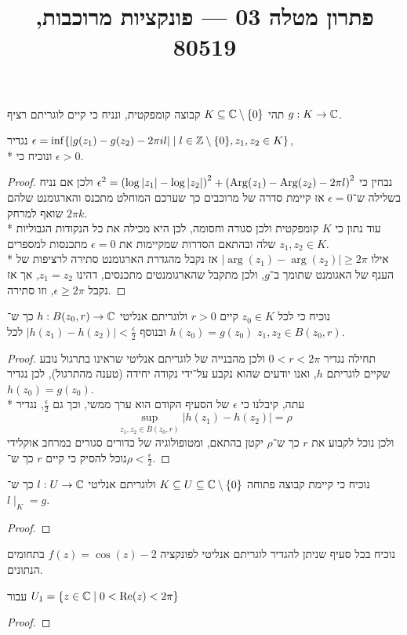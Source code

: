 
\title{פתרון מטלה 03 --- פונקציות מרוכבות, 80519}


\maketitle
\maketitleprint{}

\Question{}
תהי $K \subseteq \mathbb{C} \setminus \{ 0 \}$ קבוצה קומפקטית, ונניח כי קיים לוגריתם רציף $g : K \to \mathbb{C}$.

\Subquestion{}
נגדיר $\epsilon = \inf \{ |g(z_1) - g(z_2) - 2 \pi i l| \mid l \in \mathbb{Z} \setminus \{ 0 \}, z_1, z_2 \in K \}$, \\*
ונוכיח כי $\epsilon > 0$.
\begin{proof}
	נבחין כי $\epsilon^2 = {(\log|z_1| - \log|z_2|)}^2 + {(\operatorname{Arg}(z_1) - \operatorname{Arg}(z_2) - 2 \pi l)}^2$ ולכן אם נניח בשלילה ש־$\epsilon = 0$ אז קיימת סדרה של מרוכבים כך שערכם המוחלט מתכנס והארגומנט שלהם שואף למרחק $2\pi k$. \\*
	עוד נתון כי $K$ קומפקטית ולכן סגורה וחסומה, לכן היא מכילה את כל הנקודות הגבוליות שלה ובהתאם הסדרות שמקיימות את $\epsilon = 0$ מתכנסות למספרים $z_1, z_2 \in K$. \\*
	אילו $|\arg(z_1) - \arg(z_2)| \ge 2\pi$ אז נקבל מהגדרת הארגומנט סתירה לרציפות של הענף של האגומנט שתומך ב־$g$, ולכן מתקבל שהארגומנטים מתכנסים, דהינו $z_1 = z_2$, אך אז נקבל $\epsilon \ge 2\pi$, וזו סתירה.
\end{proof}

\Subquestion{}
נוכיח כי לכל $z_0 \in K$ קיים $r > 0$ ולוגריתם אנליטי $h : B(z_0, r) \to \mathbb{C}$ כך ש־$h(z_0) = g(z_0)$ ובנוסף $|h(z_1) - h(z_2)| < \frac{\epsilon}{2}$ לכל $z_1, z_2 \in B(z_0, r)$.
\begin{proof}
	תחילה נגדיר $0 < r < 2 \pi$ ולכן מהבנייה של לוגריתם אנליטי שראינו בתרגול נובע שקיים לוגריתם $h$, ואנו יודעים שהוא נקבע על־ידי נקודה יחידה (טענה מהתרגול), לכן נגדיר $h(z_0) = g(z_0)$. \\*
	עתה, קיבלנו כי $\epsilon$ של הסעיף הקודם הוא ערך ממשי, וכך גם $\frac{\epsilon}{2}$, נגדיר
	\[
		\sup_{z_1, z_2 \in \overline{B}(z_0, r)} |h(z_1) - h(z_2)| = \rho
	\]
	ולכן נוכל לקבוע את $r$ כך ש־$\rho$ יקטן בהתאם, ומטופולוגיה של כדורים סגורים במרחב אוקלידי נוכל להסיק כי קיים $r$ כך ש־$\rho < \frac{\epsilon}{2}$.
\end{proof}

\Subquestion{}
נוכיח כי קיימת קבוצה פתוחה $K \subseteq U \subseteq \mathbb{C} \setminus \{ 0 \}$ ולוגריתם אנליטי $l : U \to \mathbb{C}$ כך ש־$l \mid_K = g$.
\begin{proof}
	
\end{proof}

\Question{}
נוכיח בכל סעיף שניתן להגדיר לוגריתם אנליטי לפונקציה $f(z) = \cos(z) - 2$ בתחומים הנתונים.

\Subquestion{}
עבור $U_1 = \{ z \in \mathbb{C} \mid 0 < \operatorname{Re}(z) < 2\pi \}$
\begin{proof}
	
\end{proof}


